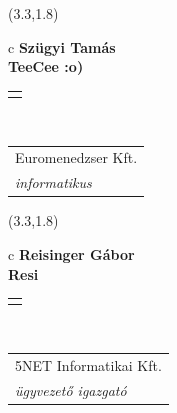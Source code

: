 \documentclass[11pt]{article}
\begin{document}
\makebox(3.3,1.8){
  \renewcommand\arraystretch{1.3}
  \begin{tabular}[c]{c}
    \hspace{8.5mm}
    \LARGE\bf{ Szügyi Tamás }\\
    \hspace{8.5mm}
    \Large{ TeeCee :o) }\\
    \renewcommand\arraystretch{3}
    \begin{tabular}[c]{c}
      \centering
      \fontfamily{phv}\selectfont{
        \textbf{
          \textsc{
            \scriptsize{
            \color{Dark}{ Ismerkedő }\color{Dark}{ Webmester }\color{Dark}{ Sminkmester }\color{Dark}{ Programozó }
            }
          }
        }
      }
    \end{tabular}
    \\
    \renewcommand\arraystretch{1}
    \begin{tabular}{p{3.3in}}
      \hspace{.7cm}Euromenedzser Kft.\\
      \hspace{.7cm}\emph{ informatikus }\\
    \end{tabular}
  \end{tabular}
}

\makebox(3.3,1.8){
  \renewcommand\arraystretch{1.3}
  \begin{tabular}[c]{c}
    \hspace{8.5mm}
    \LARGE\bf{ Reisinger Gábor }\\
    \hspace{8.5mm}
    \Large{ Resi }\\
    \renewcommand\arraystretch{3}
    \begin{tabular}[c]{c}
      \centering
      \fontfamily{phv}\selectfont{
        \textbf{
          \textsc{
            \scriptsize{
            \color{Bright}{ Ismerkedő }\color{Bright}{ Webmester }\color{Bright}{ Sminkmester }\color{Bright}{ Programozó }
            }
          }
        }
      }
    \end{tabular}
    \\
    \renewcommand\arraystretch{1}
    \begin{tabular}{p{3.3in}}
      \hspace{.7cm}5NET Informatikai Kft.\\
      \hspace{.7cm}\emph{ ügyvezető igazgató }\\
    \end{tabular}
  \end{tabular}
}
\end{document}
